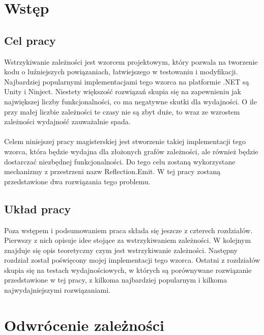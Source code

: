 \documentclass[12pt]{article}
\begin{document}
\clearpage
\tableofcontents


\clearpage
\section{Wstęp}
\subsection{Cel pracy}
Wstrzykiwanie zależności jest wzorcem projektowym, który pozwala na tworzenie kodu o luźniejszych powiązaniach, łatwiejszego w testowaniu i modyfikacji. Najbardziej popularnymi implementacjami tego wzorca na platformie .NET są Unity i Ninject. Niestety większość rozwiązań skupia się na zapewnieniu jak największej liczby funkcjonalności, co ma negatywne skutki dla wydajności. O ile przy małej liczbie zależności te czasy nie są zbyt duże, to wraz ze wzrostem zależności wydajność zauważalnie spada.\\
\\
Celem niniejszej pracy magisterskiej jest stworzenie takiej implementacji tego wzorca, która będzie wydajna dla złożonych grafów zależności, ale również będzie dostarczać niezbędnej funkcjonalności. Do tego celu zostaną wykorzystane mechanizmy z przestrzeni nazw Reflection.Emit. W tej pracy zostaną przedstawione dwa rozwiązania tego problemu.

\subsection{Układ pracy}
Poza wstępem i podsumowaniem praca składa się jeszcze z czterech rozdziałów. Pierwszy z nich opisuje idee stojące za wstrzykiwaniem zależności. W kolejnym znajduje się opis teoretyczny czym jest wstrzykiwanie zależności. Następny rozdział został poświęcony mojej implementacji tego wzorca. Ostatni z rozdziałów skupia się na testach wydajnościowych, w których są porównywane rozwiązanie przedstawione w tej pracy, z kilkoma najbardziej popularnym i kilkoma najwydajniejszymi rozwiązaniami.



\clearpage
\section{Odwrócenie zależności}
\end{document}
